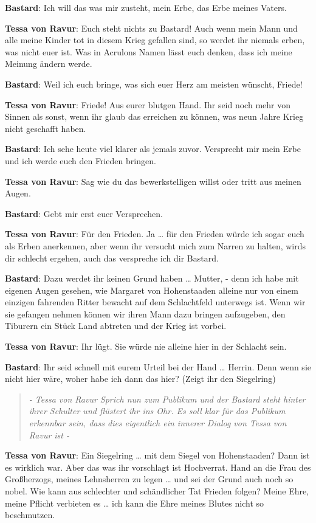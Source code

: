 \documentclass[a5paper,7pt, twocolumn]{book}
\begin{document}
\textbf{Bastard}: Ich will das was mir zusteht, mein Erbe, das Erbe meines Vaters.

\textbf{Tessa von Ravur}: Euch steht nichts zu Bastard! Auch wenn mein Mann und alle meine Kinder tot in diesem Krieg gefallen sind, so werdet ihr niemals erben, was nicht euer ist. Was in Acrulons Namen lässt euch denken, dass ich meine Meinung ändern werde.

\textbf{Bastard}: Weil ich euch bringe, was sich euer Herz am meisten wünscht, Friede!

\textbf{Tessa von Ravur}: Friede! Aus eurer blutgen Hand. Ihr seid noch mehr von Sinnen als sonst, wenn ihr glaub das erreichen zu können, was neun Jahre Krieg nicht geschafft haben.

\textbf{Bastard}: Ich sehe heute viel klarer als jemals zuvor. Versprecht mir mein Erbe und ich werde euch den Frieden bringen.

\textbf{Tessa von Ravur}: Sag wie du das bewerkstelligen willst oder tritt aus meinen Augen.

\textbf{Bastard}: Gebt mir erst euer Versprechen.

\textbf{Tessa von Ravur}: Für den Frieden. Ja … für den Frieden würde ich sogar euch als Erben anerkennen, aber wenn ihr versucht mich zum Narren zu halten, wirds dir schlecht ergehen, auch das verspreche ich dir Bastard.

\textbf{Bastard}: Dazu werdet ihr keinen Grund haben … Mutter, - denn ich habe mit eigenen Augen gesehen, wie Margaret von Hohenstaaden alleine nur von einem einzigen fahrenden Ritter bewacht auf dem Schlachtfeld unterwegs ist. Wenn wir sie gefangen nehmen können wir ihren Mann dazu bringen aufzugeben, den Tiburern ein Stück Land abtreten und der Krieg ist vorbei.

\textbf{Tessa von Ravur}: Ihr lügt. Sie würde nie alleine hier in der Schlacht sein.

\textbf{Bastard}: Ihr seid schnell mit eurem Urteil bei der Hand … Herrin. Denn wenn sie nicht hier wäre, woher habe ich dann das hier? (Zeigt ihr den Siegelring)

\begin{quote}
  \textit{- Tessa von Ravur Sprich nun zum Publikum und der Bastard steht hinter ihrer Schulter und flüstert ihr ins Ohr. Es soll klar für das Publikum erkennbar sein, dass dies eigentlich ein innerer Dialog von Tessa von Ravur ist -
}
 \end{quote}

\textbf{Tessa von Ravur}: Ein Siegelring … mit dem Siegel von Hohenstaaden? Dann ist es wirklich war. Aber das was ihr vorschlagt ist Hochverrat. Hand an die Frau des Großherzogs, meines Lehnsherren zu legen … und sei der Grund auch noch so nobel. Wie kann aus schlechter und schändlicher Tat Frieden folgen? Meine Ehre, meine Pflicht verbieten es … ich kann die Ehre meines Blutes nicht so beschmutzen.
\end{document}
